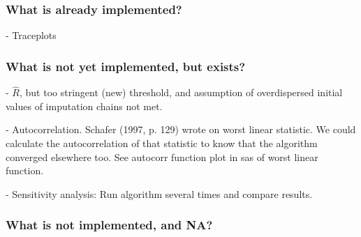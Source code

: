 \documentclass[article]{jss}
\begin{document}
\subsubsection{What is already implemented?}

- Traceplots

\subsubsection{What is not yet implemented, but exists?}

- $\widehat{R}$, but too stringent (new) threshold, and assumption of overdispersed initial values of imputation chains not met.

- Autocorrelation. Schafer (1997, p. 129) wrote on worst linear statistic. We could calculate the autocorrelation of that statistic to know that the algorithm converged elsewhere too. See autocorr function plot in sas of worst linear function.

- Sensitivity analysis: Run algorithm several times and compare results. 

\subsubsection{What is not implemented, and NA?}
\end{document}
